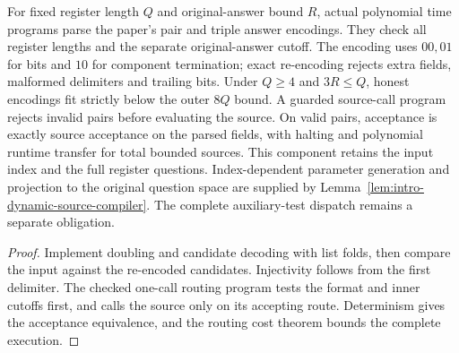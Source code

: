 \begin{lemma}
\label{lem:intro-answer-parser}
\leanok
For fixed register length $Q$ and original-answer bound $R$, actual polynomial
time programs parse the paper's pair and triple answer encodings. They check
all register lengths and the separate original-answer cutoff. The encoding
uses $00,01$ for bits and $10$ for component termination; exact re-encoding
rejects extra fields, malformed delimiters and trailing bits. Under $Q\geq4$
and $3R\leq Q$, honest encodings fit strictly below the outer $8Q$ bound.
A guarded source-call program rejects invalid pairs before evaluating the
source. On valid pairs, acceptance is exactly source acceptance on the parsed
fields, with halting and polynomial runtime transfer for total bounded sources.
This component retains the input index and the full register questions.
Index-dependent parameter generation and projection to the original question
space are supplied by Lemma~\ref{lem:intro-dynamic-source-compiler}.
The complete auxiliary-test dispatch remains a separate obligation.
\end{lemma}
\begin{proof}
\leanok
Implement doubling and candidate decoding with list folds, then compare the
input against the re-encoded candidates. Injectivity follows from the first
delimiter. The checked one-call routing program tests the format and inner
cutoffs first, and calls the source only on its accepting route. Determinism
gives the acceptance equivalence, and the routing cost theorem bounds the
complete execution.
\end{proof}

